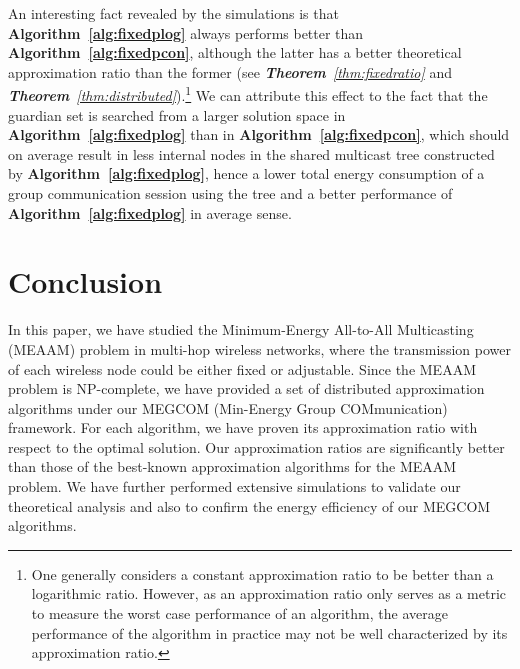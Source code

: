 \documentclass[10pt, conference, compsocconf]{IEEEtran}
\begin{document}
  An interesting fact revealed by the simulations is that \textbf{Algorithm~\ref{alg:fixedplog}} always performs better than \textbf{Algorithm~\ref{alg:fixedpcon}}, although the latter has a better theoretical approximation ratio than the former (see \textit{\textbf{Theorem}~\ref{thm:fixedratio}} and \textit{\textbf{Theorem}~\ref{thm:distributed}}).\footnote{One generally considers a constant approximation ratio to be better than a logarithmic ratio. However, as an approximation ratio only serves as a metric to measure the worst case performance of an algorithm, the average performance of the algorithm in practice may not be well characterized by its approximation ratio.} We can attribute this effect to the fact that the guardian set is searched from a larger solution space in \textbf{Algorithm~\ref{alg:fixedplog}} than in \textbf{Algorithm~\ref{alg:fixedpcon}}, which should on average result in less internal nodes in the shared multicast tree constructed by \textbf{Algorithm~\ref{alg:fixedplog}}, hence a lower total energy consumption of a group communication session using the tree and a better performance of \textbf{Algorithm~\ref{alg:fixedplog}} in average sense.



\section{Conclusion} \label{sec:con}
In this paper, we have studied the Minimum-Energy All-to-All Multicasting (MEAAM) problem in multi-hop wireless networks, where the transmission power of each wireless node could be either fixed or adjustable. Since the MEAAM problem is NP-complete, we have provided a set of distributed approximation algorithms under our MEGCOM (Min-Energy Group COMmunication) framework. For each algorithm, we have proven its approximation ratio with respect to the optimal solution. Our approximation ratios are significantly better than those of the best-known approximation algorithms for the MEAAM problem. We have further performed extensive simulations to validate our theoretical analysis and also to confirm the energy efficiency of our MEGCOM algorithms.







\end{document}

